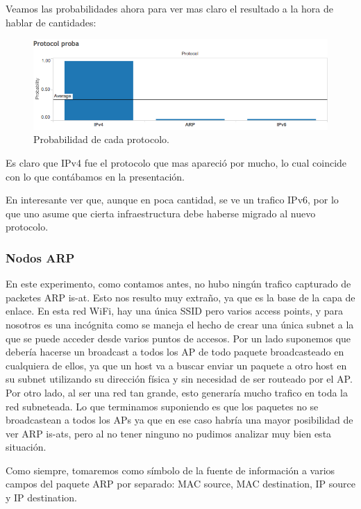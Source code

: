 \documentclass{article}
\theoremstyle{definition}
\theoremstyle{remark}
\begin{document}
Veamos las probabilidades ahora para ver mas claro el resultado a la hora de hablar de cantidades:

\begin{figure}[H]
\centering
\includegraphics[width=420pt]{captures/MercadoLibre/Protocol PDF Dashboard probability.png}
\caption{Probabilidad de cada protocolo.}
\end{figure}

Es claro que IPv4 fue el protocolo que mas apareció por mucho, lo cual coincide con lo que contábamos en la presentación. 

En interesante ver que, aunque en poca cantidad, se ve un trafico IPv6, por lo que uno asume que cierta infraestructura debe haberse migrado al nuevo protocolo.

\subsubsection{Nodos ARP}
En este experimento, como contamos antes, no hubo ningún trafico capturado de packetes ARP is-at. Esto nos resulto muy extraño, ya que es la base de la capa de enlace. En esta red WiFi, hay una única SSID pero varios access points, y para nosotros es una incógnita como se maneja el hecho de crear una única subnet a la que se puede acceder desde varios puntos de accesos. Por un lado suponemos que debería hacerse un broadcast a todos los AP de todo paquete broadcasteado en cualquiera de ellos, ya que un host va a buscar enviar un paquete a otro host en su subnet utilizando su dirección física y sin necesidad de ser routeado por el AP. Por otro lado, al ser una red tan grande, esto generaría mucho trafico en toda la red subneteada. Lo que terminamos suponiendo es que los paquetes no se broadcastean a todos los APs ya que en ese caso habría una mayor posibilidad de ver ARP is-ats, pero al no tener ninguno no pudimos analizar muy bien esta situación.

Como siempre, tomaremos como símbolo de la fuente de información a varios campos del paquete ARP por separado: MAC source, MAC destination, IP source y IP destination.
\end{document}
